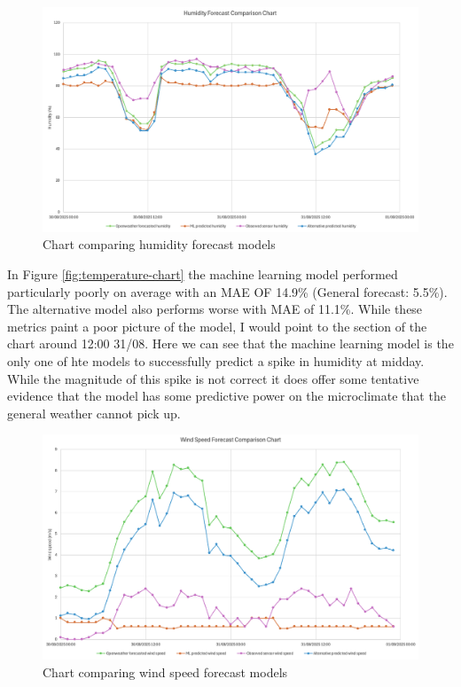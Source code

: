 \begin{figure}[H]
    \centering
    \includegraphics[width=1\textwidth]{contents/part-4/fig4/humidity-graph.png}
    \caption{Chart comparing humidity forecast models}
    \label{fig:humidity-chart}
\end{figure}

In Figure \ref{fig:temperature-chart} the machine learning model performed
particularly poorly on average with an MAE OF 14.9\% (General forecast: 5.5\%).
The alternative model also performs worse with MAE of 11.1\%. While these
metrics paint a poor picture of the model, I would point to the section of the
chart around 12:00 31/08. Here we can see that the machine learning model is the
only one of hte models to successfully predict a spike in humidity at midday.
While the magnitude of this spike is not correct it does offer some tentative
evidence that the model has some predictive power on the microclimate that the
general weather cannot pick up.

\begin{figure}[H]
    \centering
    \includegraphics[width=1\textwidth]{contents/part-4/fig4/wind-speed-graph.png}
    \caption{Chart comparing wind speed forecast models}
    \label{fig:wind-chart}
\end{figure}

